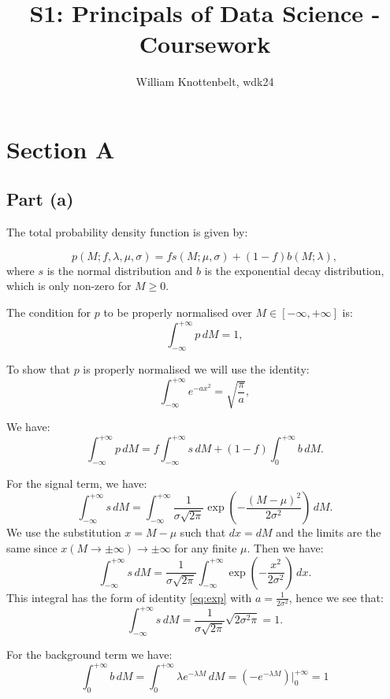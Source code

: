 \documentclass{article}
\title{S1: Principals of Data Science - Coursework}
\author{William Knottenbelt, wdk24}
\begin{document}
\maketitle


\section*{Section A}

\subsection*{Part (a)}

The total probability density function is given by:

\[ p(M; f, \lambda, \mu, \sigma) = fs(M; \mu, \sigma) + (1-f)b(M; \lambda), \]
where $s$ is the normal distribution and $ b$ is the exponential decay distribution, which is only non-zero for $M \geq 0$.

The condition for $p$ to be properly normalised over $M \in [-\infty, +\infty]$ is:
\[ \int_{-\infty}^{+\infty} p \, dM = 1, \]

To show that $p$ is properly normalised we will use the identity:
\begin{equation}
\int_{-\infty}^{+\infty} e^{-ax^2} = \sqrt{\frac{\pi}{a}},
\label{eq:exp}
\end{equation}

We have:
\[ 
\int_{-\infty}^{+\infty} p \, dM = 
f\int_{-\infty}^{+\infty} s \, dM + 
(1-f)\int_{0}^{+\infty} b \, dM.
\]

For the signal term, we have:
\[
\int_{-\infty}^{+\infty} s \, dM =
\int_{-\infty}^{+\infty} \frac{1}{\sigma\sqrt{2\pi}} \exp\left(-\frac{(M - \mu)^2}{2\sigma^2}\right) \, dM.
\]
We use the substitution $x = M - \mu$ such that $dx = dM$ and the limits are the same since $x(M \to \pm\infty) \to \pm\infty$ for any finite $\mu$. Then we have:
\[
\int_{-\infty}^{+\infty} s \, dM =
\frac{1}{\sigma\sqrt{2\pi}} \int_{-\infty}^{+\infty} \exp\left(-\frac{x^2}{2\sigma^2}\right) \, dx.
\]
This integral has the form of identity \eqref{eq:exp} with $a = \frac{1}{2\sigma^2}$, hence we see that:
\[
\int_{-\infty}^{+\infty} s \, dM =
\frac{1}{\sigma\sqrt{2\pi}} \sqrt{2\sigma^2\pi} = 1.
\]

For the background term we have:
\[
\int_{0}^{+\infty} b \, dM =
\int_{0}^{+\infty} \lambda e^{-\lambda M} \, dM =
(-e^{-\lambda M}) |_0^{+\infty} = 1
\]
\end{document}
